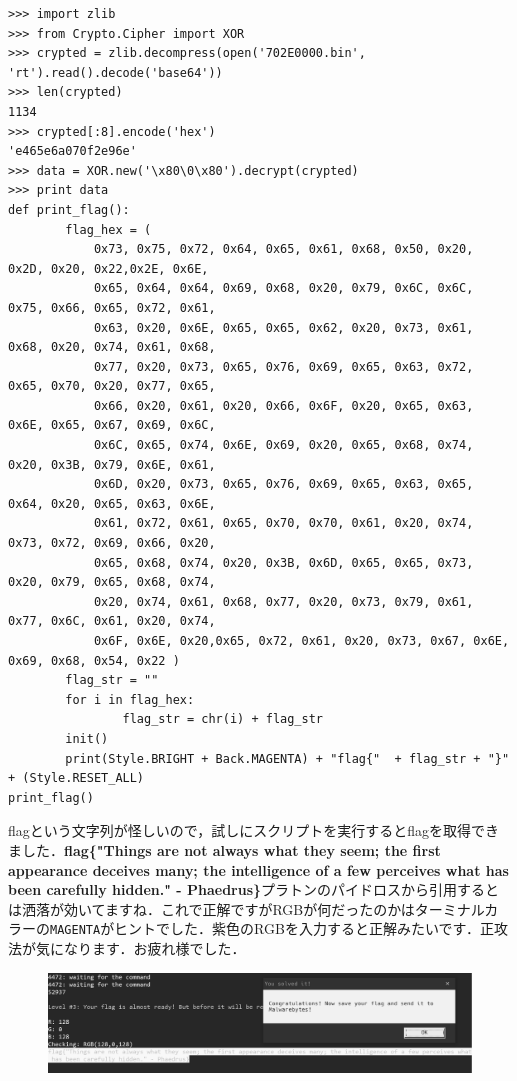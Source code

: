 \begin{tcolorbox}[title=XORを使ったデコード, sharp corners, left=2mm]\scriptsize
\begin{verbatim}
>>> import zlib
>>> from Crypto.Cipher import XOR
>>> crypted = zlib.decompress(open('702E0000.bin', 'rt').read().decode('base64'))
>>> len(crypted)
1134
>>> crypted[:8].encode('hex')
'e465e6a070f2e96e'
>>> data = XOR.new('\x80\0\x80').decrypt(crypted)
>>> print data
def print_flag():
        flag_hex = ( 
            0x73, 0x75, 0x72, 0x64, 0x65, 0x61, 0x68, 0x50, 0x20, 0x2D, 0x20, 0x22,0x2E, 0x6E, 
            0x65, 0x64, 0x64, 0x69, 0x68, 0x20, 0x79, 0x6C, 0x6C, 0x75, 0x66, 0x65, 0x72, 0x61, 
            0x63, 0x20, 0x6E, 0x65, 0x65, 0x62, 0x20, 0x73, 0x61, 0x68, 0x20, 0x74, 0x61, 0x68, 
            0x77, 0x20, 0x73, 0x65, 0x76, 0x69, 0x65, 0x63, 0x72, 0x65, 0x70, 0x20, 0x77, 0x65, 
            0x66, 0x20, 0x61, 0x20, 0x66, 0x6F, 0x20, 0x65, 0x63, 0x6E, 0x65, 0x67, 0x69, 0x6C, 
            0x6C, 0x65, 0x74, 0x6E, 0x69, 0x20, 0x65, 0x68, 0x74, 0x20, 0x3B, 0x79, 0x6E, 0x61, 
            0x6D, 0x20, 0x73, 0x65, 0x76, 0x69, 0x65, 0x63, 0x65, 0x64, 0x20, 0x65, 0x63, 0x6E, 
            0x61, 0x72, 0x61, 0x65, 0x70, 0x70, 0x61, 0x20, 0x74, 0x73, 0x72, 0x69, 0x66, 0x20, 
            0x65, 0x68, 0x74, 0x20, 0x3B, 0x6D, 0x65, 0x65, 0x73, 0x20, 0x79, 0x65, 0x68, 0x74, 
            0x20, 0x74, 0x61, 0x68, 0x77, 0x20, 0x73, 0x79, 0x61, 0x77, 0x6C, 0x61, 0x20, 0x74, 
            0x6F, 0x6E, 0x20,0x65, 0x72, 0x61, 0x20, 0x73, 0x67, 0x6E, 0x69, 0x68, 0x54, 0x22 )
        flag_str = ""
        for i in flag_hex:
                flag_str = chr(i) + flag_str
        init()
        print(Style.BRIGHT + Back.MAGENTA) + "flag{"  + flag_str + "}" + (Style.RESET_ALL)
print_flag()
\end{verbatim}
\end{tcolorbox}
flagという文字列が怪しいので，試しにスクリプトを実行するとflagを取得できました\faFlag．\textbf{flag\{"Things are not always what they seem; the first appearance deceives many; the intelligence of a few perceives what has been carefully hidden." - Phaedrus\}}プラトンのパイドロスから引用するとは洒落が効いてますね．これで正解ですがRGBが何だったのかはターミナルカラーの\texttt{MAGENTA}がヒントでした．紫色のRGBを入力すると正解みたいです．正攻法が気になります．お疲れ様でした．
\begin{figure}[H]
    \centering
    \includegraphics[width=\linewidth]{./assets/takuzoo3868asset/crack_level3_gray.png}
    \label{fig:crack_level3}
\end{figure}

